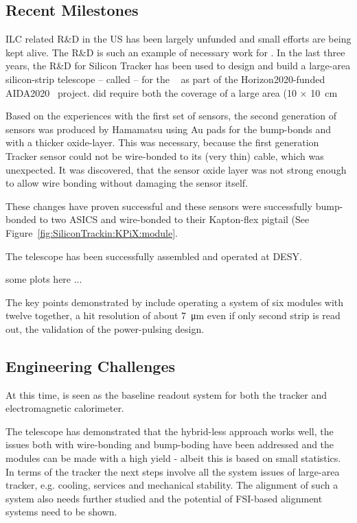 \subsection{Recent Milestones}
ILC related R\&D in the US has been largely unfunded and small efforts are being kept alive. The \KPIX R\&D is such an example of necessary work for \SID.
In the last three years, the R\&D for \KPIX Silicon Tracker has been used to design and build a large-area silicon-strip 
telescope -- called \LYCORIS -- for the \DIITBF~\cite{desytb2018} as part of the Horizon2020-funded AIDA2020~\cite{AIDA2020} project.
\LYCORIS did require both the coverage of a large area (10 $\times$ \SI{10}{\centi\meter}

Based on the experiences with the first set of sensors, the second generation of sensors was produced by Hamamatsu 
using Au pads for the \KPIX bump-bonds and with a thicker oxide-layer. This was necessary, because the first generation Tracker sensor could not be 
wire-bonded to its (very thin) cable, which was unexpected. It was discovered, that the sensor oxide layer was not strong enough 
to allow wire bonding without damaging the sensor itself.

These changes have proven successful and these sensors were successfully bump-bonded to two \KPIX ASICS and wire-bonded to their Kapton-flex pigtail 
(See Figure~\ref{fig:SiliconTrackin:KPiX:module}. 

The \LYCORIS telescope has been successfully assembled and operated at DESY. 

some plots here ...

The key points demonstrated by \LYCORIS include operating a system of six modules with twelve \KPIX together, 
a hit resolution of about \SI{7}{\micro\meter} even if only second strip is read out, the 
validation of the power-pulsing design.



\subsection{Engineering Challenges}
At this time, \KPIX is seen as the baseline readout system for both the \SID tracker and electromagnetic calorimeter. 

The \LYCORIS telescope has demonstrated that the hybrid-less approach works well, the issues both with wire-bonding and 
bump-boding have been addressed and the modules can be made with a high yield - albeit this is based on small statistics.
In terms of the \SID tracker the next steps involve all the system issues of large-area tracker, e.g. cooling, services and mechanical stability. 
The alignment of such a system also needs further studied and the potential of FSI-based alignment systems need to be shown. 

